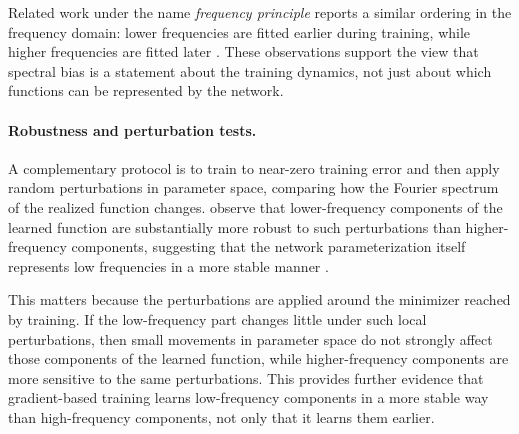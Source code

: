Related work under the name \emph{frequency principle} reports a similar
ordering in the frequency domain: lower frequencies are fitted earlier during
training, while higher frequencies are fitted later
\citep{xu2019training,zhi2020frequency}. These observations support the view
that spectral bias is a statement about the training dynamics, not just about
which functions can be represented by the network.

\paragraph{Robustness and perturbation tests.}
A complementary protocol is to train to near-zero training error and then apply
random perturbations in parameter space, comparing how the Fourier spectrum of
the realized function changes. \citet{rahaman2019spectralbiasneuralnetworks}
observe that lower-frequency components of the learned function are
substantially more robust to such perturbations than higher-frequency
components, suggesting that the network parameterization itself represents low
frequencies in a more stable manner \citep{rahaman2019spectralbiasneuralnetworks}.

\begin{revblock}
	This matters because the perturbations are applied around the minimizer reached by training. If the
	low-frequency part changes little under such local perturbations, then small
	movements in parameter space do not strongly affect those components of the
	learned function, while higher-frequency components are more sensitive to the
	same perturbations. This provides further evidence that gradient-based training
	learns low-frequency components in a more stable way than high-frequency
	components, not only that it learns them earlier.
\end{revblock}

